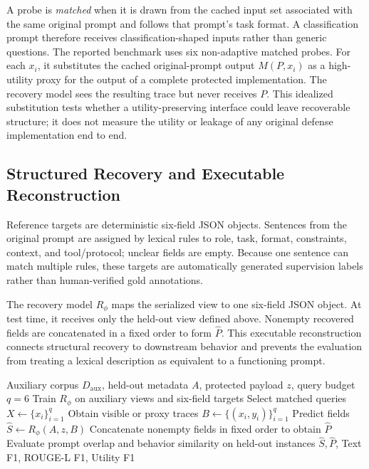 \documentclass[letterpaper]{article} %
\begin{document}
A probe is \emph{matched} when it is drawn from the cached input set associated with the same original prompt and follows that prompt's task format.  A classification prompt therefore receives classification-shaped inputs rather than generic questions.  The reported benchmark uses six non-adaptive matched probes.  For each \(x_i\), it substitutes the cached original-prompt output \(M(P,x_i)\) as a high-utility proxy for the output of a complete protected implementation.  The recovery model sees the resulting trace but never receives \(P\).  This idealized substitution tests whether a utility-preserving interface could leave recoverable structure; it does not measure the utility or leakage of any original defense implementation end to end.

\subsection{Structured Recovery and Executable Reconstruction}

Reference targets are deterministic six-field JSON objects.  Sentences from the original prompt are assigned by lexical rules to role, task, format, constraints, context, and tool/protocol; unclear fields are empty.  Because one sentence can match multiple rules, these targets are automatically generated supervision labels rather than human-verified gold annotations.

The recovery model \(R_\phi\) maps the serialized view to one six-field JSON object.  At test time, it receives only the held-out view defined above.  Nonempty recovered fields are concatenated in a fixed order to form \(\hat{P}\).  This executable reconstruction connects structural recovery to downstream behavior and prevents the evaluation from treating a lexical description as equivalent to a functioning prompt.

\begin{algorithm}[t]
\caption{Multi-Evidence Structured Prompt Recovery}
\label{alg:recovery}
\begin{algorithmic}[1]
\REQUIRE Auxiliary corpus \(D_{\mathrm{aux}}\), held-out metadata \(A\), protected payload \(z\), query budget \(q=6\)
\STATE Train \(R_\phi\) on auxiliary views and six-field targets
\STATE Select matched queries \(X\leftarrow\{x_i\}_{i=1}^{q}\)
\STATE Obtain visible or proxy traces \(B\leftarrow\{(x_i,y_i)\}_{i=1}^{q}\)
\STATE Predict fields \(\hat{S}\leftarrow R_\phi(A,z,B)\)
\STATE Concatenate nonempty fields in fixed order to obtain \(\hat{P}\)
\STATE Evaluate prompt overlap and behavior similarity on held-out instances
\RETURN \(\hat{S},\hat{P}\), Text F1, ROUGE-L F1, Utility F1
\end{algorithmic}
\end{algorithm}
\end{document}
